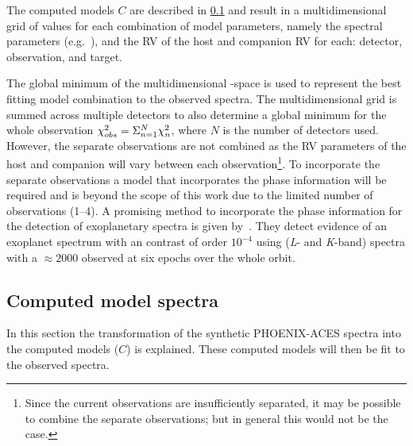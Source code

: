 The computed models \(C\) are described in \cref{subsec:models} and result in a multidimensional grid of \textchisquared{} values for each combination of model parameters, namely the spectral parameters (e.g.\ \Teff{}), and the {RV} of the host and companion {RV} for each: detector, observation, and target.

The global minimum of the multidimensional \textchisquared-space is used to represent the best fitting model combination to the observed spectra.
The multidimensional \textchisquared{} grid is summed across multiple detectors to also determine a global minimum \textchisquared{} for the whole observation \({\chi}^{2}_{obs} = \Sigma^{N}_{n=1} {\chi}^{2}_n\), where \(N\) is the number of detectors used.
However, the separate observations are not combined as the {RV} parameters of the host and companion will vary between each observation\footnote{Since the current observations are insufficiently separated, it may be possible to combine the separate observations; but in general this would not be the case.}.
To incorporate the separate observations a model that incorporates the phase information will be required and is beyond the scope of this work due to the limited number of observations (1--4).
A promising method to incorporate the phase information for the detection of exoplanetary spectra is given by~\citet{lockwood_nearir_2014,piskorz_evidence_2016}.
They detect evidence of an exoplanet spectrum with an contrast of order \({10}^{-4}\) using \nir{} (\textit{L}- and \textit{K}-band) spectra with a \snr{}\(\approx2000\) observed at six epochs over the whole orbit.



\subsection{Computed model spectra}
\label{subsec:models}
In this section the transformation of the synthetic {PHOENIX-ACES} spectra into the computed models (\(C\)) is explained.
These computed models will then be fit to the observed spectra.

